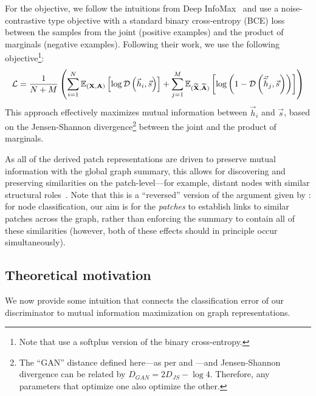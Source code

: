 \documentclass{article} \usepackage{iclr2019_conference,times}
\begin{document}
For the objective, we follow the intuitions from Deep InfoMax~\citep[DIM,][]{hjelm2018learning} and use a noise-contrastive type objective with a standard binary cross-entropy (BCE) loss between the samples from the joint (positive examples) and the product of marginals (negative examples). Following their work, we use the following objective\footnote{Note that \citet{hjelm2018learning} use a softplus version of the binary cross-entropy.}:
\begin{equation}
\label{eqngan}
	\mathcal{L} = \frac{1}{N+M}\left(\sum_{i=1}^N\mathbb{E}_{({\bf X}, {\bf A})}\left[\log \mathcal{D}\left(\vec{h}_i, \vec{s}\right)\right] + \sum_{j=1}^M\mathbb{E}_{({\bf \widetilde{X}}, {\bf \widetilde{A}})}\left[\log\left(1 - \mathcal{D}\left(\vec{\widetilde{h}}_j, \vec{s}\right)\right)\right]\right)
\end{equation} 
This approach effectively maximizes mutual information between $\vec{h}_i$ and $\vec{s}$, based on the Jensen-Shannon divergence\footnote{The ``GAN'' distance defined here---as per \cite{goodfellow2014generative} and \cite{nowozin2016f}---and Jensen-Shannon divergence can be related by $D_{GAN} = 2D_{JS} - \log{4}$. Therefore, any parameters that optimize one also optimize the other.} between the joint and the product of marginals.

As all of the derived patch representations are driven to preserve mutual information with the global graph summary, this allows for discovering and preserving similarities on the patch-level---for example, distant nodes with similar structural roles~\citep[which are known to be a strong predictor for many node classification tasks;][]{donnat2018}. Note that this is a ``reversed'' version of the argument given by \citet{hjelm2018learning}: for node classification, our aim is for the \emph{patches} to establish links to similar patches across the graph, rather than enforcing the summary to contain all of these similarities (however, both of these effects should in principle occur simultaneously).

\subsection{Theoretical motivation}

We now provide some intuition that connects the classification error of our discriminator to mutual information maximization on graph representations.
\end{document}
